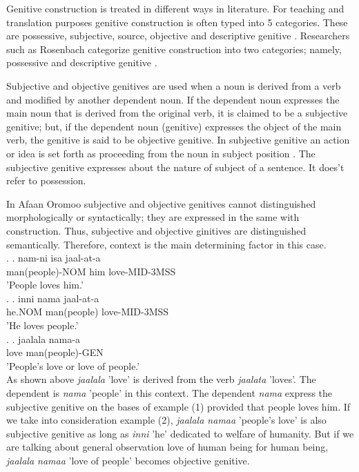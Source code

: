 \documentclass[11pt,a4paper]{article}
\begin{document}
	Genitive construction is treated in different ways in literature. For teaching and translation purposes genitive construction is often typed into 5 categories. These are possessive, subjective, source, objective and descriptive genitive \cite{ELTcon}. Researchers such as Rosenbach categorize genitive construction into two categories; namely, possessive and descriptive genitive \cite{rosenbach2006descriptive,gebregziabher2012alienable}. 
	
	
	Subjective and objective genitives are used when a noun is derived from a verb and modified by another dependent noun. If the dependent noun expresses the main noun that is derived from the original verb, it is claimed to be a subjective genitive; but, if the dependent noun (genitive) expresses the object of the main verb, the genitive is said to be objective genitive. In subjective genitive an action or idea is set forth as proceeding from the noun in subject position \cite[68]{greenlee1950genitive}. The subjective genitive expresses about the nature of subject of a sentence. It does’t refer to possession. 
	
	
	In Afaan Oromoo subjective and objective genitives cannot distinguished morphologically or syntactically; they are expressed in the same with construction. Thus, subjective and objective ginitives are distinguished semantically. Therefore, context is the main determining factor in this case. \\
	
	\ex. 
	\ag.
	nam-ni isa jaal-at-a\\
	man(people)-NOM him love-MID-3MSS\\
	'People loves him.'\\
	
	\ex. 
	\ag.
	inni nama jaal-at-a\\
	he.NOM man(people) love-MID-3MSS\\
	'He loves people.'\\
	
	\ex. 
	\ag.
	jaalala nama-a\\
	love man(people)-GEN\\
	'People's love or love of people.'\\
	
	As shown above \emph{jaalala} 'love' is derived from the verb \emph{jaalata} 'loves'. The dependent is \emph{nama} 'people' in this context. The dependent \emph{nama} express the subjective genitive on the bases of example (1) provided that people loves him. If we take into consideration example (2), \emph{jaalala namaa} 'people's love' is also subjective genitive as long as \emph{inni} 'he' dedicated to welfare of humanity. But if we are talking about general observation love of human being for human being, \emph{jaalala namaa} 'love of people' becomes objective genitive. 
	
\end{document}
